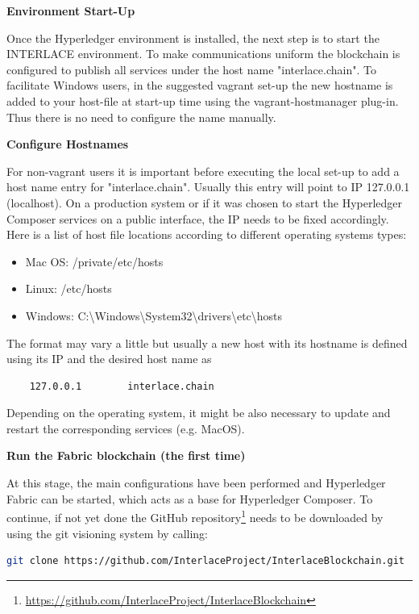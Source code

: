 \textbf{Environment Start-Up}

Once the Hyperledger environment is installed, the next step is to start the INTERLACE environment. To make communications uniform the blockchain is configured to publish all services under the host name "interlace.chain". To facilitate Windows users, in the suggested vagrant set-up the new hostname is added to your host-file at start-up time using the vagrant-hostmanager plug-in. Thus there is no need to configure the name manually.

\textbf{Configure Hostnames}

For non-vagrant users it is important before executing the local set-up to add a host name entry for "interlace.chain". Usually this entry will point to IP 127.0.0.1 (localhost). On a production system or if it was chosen to start the Hyperledger Composer services on a public interface, the IP needs to be fixed accordingly. Here is a list of host file locations according to different operating systems types:

\begin{itemize}
	\item Mac OS: /private/etc/hosts
    \item Linux: /etc/hosts
    \item Windows: C:\textbackslash Windows\textbackslash System32\textbackslash drivers\textbackslash etc\textbackslash hosts
\end{itemize}

The format may vary a little but usually a new host with its hostname is defined using its IP and the desired host name as

\begin{lstlisting}
	127.0.0.1        interlace.chain
\end{lstlisting}
Depending on the operating system, it might be also necessary to update and restart the corresponding services (e.g. MacOS).

\textbf{Run the Fabric blockchain (the first time)}

At this stage, the main configurations have been performed and Hyperledger Fabric can be started, which acts as a base for Hyperledger Composer. To continue, if not yet done the GitHub repository\footnote{\url{https://github.com/InterlaceProject/InterlaceBlockchain}} needs to be downloaded by using the git visioning system by calling:

\begin{lstlisting}[language=bash]
	git clone https://github.com/InterlaceProject/InterlaceBlockchain.git
\end{lstlisting}

